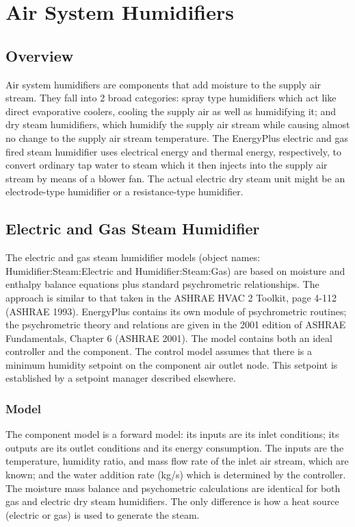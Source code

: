 \section{Air System Humidifiers }\label{air-system-humidifiers}

\subsection{Overview}\label{overview-003}

Air system humidifiers are components that add moisture to the supply air stream. They fall into 2 broad categories: spray type humidifiers which act like direct evaporative coolers, cooling the supply air as well as humidifying it; and dry steam humidifiers, which humidify the supply air stream while causing almost no change to the supply air stream temperature. The EnergyPlus electric and gas fired steam humidifier uses electrical energy and thermal energy, respectively, to convert ordinary tap water to steam which it then injects into the supply air stream by means of a blower fan. The actual electric dry steam unit might be an electrode-type humidifier or a resistance-type humidifier.

\subsection{Electric and Gas Steam Humidifier}\label{electric-and-gas-steam-humidifier}

The electric and gas steam humidifier models (object names: Humidifier:Steam:Electric and Humidifier:Steam:Gas) are based on moisture and enthalpy balance equations plus standard psychrometric relationships. The approach is similar to that taken in the ASHRAE HVAC 2 Toolkit, page 4-112 (ASHRAE 1993). EnergyPlus contains its own module of psychrometric routines; the psychrometric theory and relations are given in the 2001 edition of ASHRAE Fundamentals, Chapter 6 (ASHRAE 2001). The model contains both an ideal controller and the component. The control model assumes that there is a minimum humidity setpoint on the component air outlet node. This setpoint is established by a setpoint manager described elsewhere.

\subsubsection{Model}\label{model-001}

The component model is a forward model: its inputs are its inlet conditions; its outputs are its outlet conditions and its energy consumption. The inputs are the temperature, humidity ratio, and mass flow rate of the inlet air stream, which are known; and the water addition rate (kg/s) which is determined by the controller. The moisture mass balance and psychometric calculations are identical for both gas and electric dry steam humidifiers. The only difference is how a heat source (electric or gas) is used to generate the steam.

